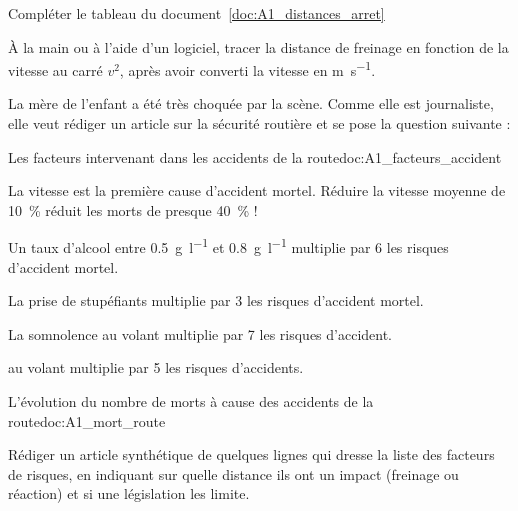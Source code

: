\numeroQuestion
Compléter le tableau du document~\ref{doc:A1_distances_arret}



\newpage
\vspace*{-36pt}

\mesure
À la main ou à l'aide d'un logiciel, tracer la distance de freinage en fonction de la vitesse au carré $v^2$, après avoir converti la vitesse en \unit{\m\per\s}.



\begin{contexte}
  La mère de l'enfant a été très choquée par la scène.
  Comme elle est journaliste, elle veut rédiger un article sur la sécurité routière et se pose la question suivante :
  
\end{contexte}

\begin{doc}{Les facteurs intervenant dans les accidents de la route}{doc:A1_facteurs_accident}
  \begin{multicols}{2}
    \begin{listePoints}  
      \item La vitesse est la première cause d'accident mortel.
      Réduire la vitesse moyenne de \qty{10}{\percent} réduit les morts de presque \qty{40}{\percent} !
      \item Un taux d'alcool entre \qty{0,5}{\g\per\litre} et \qty{0,8}{\g\per\litre} multiplie par 6 les risques d'accident mortel.
      \item La prise de stupéfiants multiplie par 3 les risques d'accident mortel.
      \item La somnolence au volant multiplie par 7 les risques d'accident.
      \item {} au volant multiplie par 5 les risques d'accidents.
    \end{listePoints}
  \end{multicols}
\end{doc}


\begin{doc}{L'évolution du nombre de morts à cause des accidents de la route}{doc:A1_mort_route}
  \centering
\end{doc}

\numeroQuestion
Rédiger un article synthétique de quelques lignes qui dresse la liste des facteurs de risques, en indiquant sur quelle distance ils ont un impact (freinage ou réaction) et si une législation les limite.
